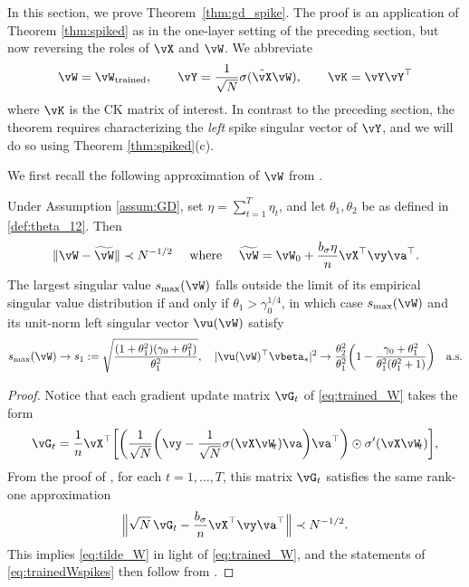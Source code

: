 In this section, we prove Theorem~\ref{thm:gd_spike}. The proof is an
application of Theorem \ref{thm:spiked} as in the one-layer setting of the
preceding section, but now reversing the roles of $\vX$ and $\vW$. We abbreviate
\[\vW=\vW_{\text{trained}}, \qquad
\vY=\frac{1}{\sqrt{N}}\sigma(\tilde{\vX}\vW), \qquad
\vK=\vY\vY^\top\]
where $\vK$ is the CK matrix of interest. In contrast to the preceding section,
the theorem requires characterizing the \emph{left} spike singular vector of
$\vY$, and we will do so using Theorem \ref{thm:spiked}(c).

We first recall the following approximation of $\vW$ from \cite{ba2022high}.
\begin{prop} \label{prop:W_spike}
Under Assumption \ref{assum:GD}, set $\eta=\sum_{t=1}^T \eta_t$, and let
$\theta_1,\theta_2$ be as defined in \eqref{def:theta_12}. Then
	\begin{align}
\|\vW-\widetilde \vW\| \prec N^{-1/2} \quad \text{ where } \quad
		\widetilde\vW=\vW_0+\frac{b_\sigma\eta}{n}\vX^\top\vy\va^\top.\label{eq:tilde_W}
	\end{align}
The largest singular value $s_{\max}(\vW)$ falls outside the limit of its
empirical singular value distribution if and only if
$\theta_1>\gamma_0^{1/4}$, in which case $s_{\max}(\vW)$ 
and its unit-norm left singular vector $\vu(\vW)$ satisfy
	\begin{equation}\label{eq:trainedWspikes}
			s_{\max}(\vW)\to s_1:=
\sqrt{\frac{(1+\theta_1^2)(\gamma_0+\theta_1^2)}{\theta_1^2}}, \quad
		|\vu(\vW)^\top
\vbeta_*|^2\to\frac{\theta_2^2}{\theta_1^2}\left(1-\frac{\gamma_0+\theta_1^2}{\theta_1^2(\theta_1^2+1)}\right)
\quad \text{a.s.}
\end{equation}
\end{prop}
\begin{proof}
Notice that each gradient update matrix
$\vG_t$ of \eqref{eq:trained_W} takes the form
\begin{align*} 
	\vG_t=
   \frac{1}{n} \vX^\top \left[\left(\frac{1}{\sqrt{N}}\left(\vy -
\frac{1}{\sqrt{N}}\sigma(\vX\vW_{\!t})\va\right)\va^\top\right) \odot
\sigma'(\vX\vW_{\!t})\right], 
\end{align*}  
From the proof of \cite[Lemma 16]{ba2022high}, for each $t=1,\ldots,T$, this
matrix $\vG_t$ satisfies the same rank-one approximation
\[\Big\|\sqrt{N}\,\vG_t-\frac{b_\sigma}{n}\vX^\top\vy\va^\top\Big\|
\prec N^{-1/2}.\]
This implies \eqref{eq:tilde_W} in light of \eqref{eq:trained_W},
and the statements of \eqref{eq:trainedWspikes} then
follow from  \cite[Theorem 3]{ba2022high}.
\end{proof}

